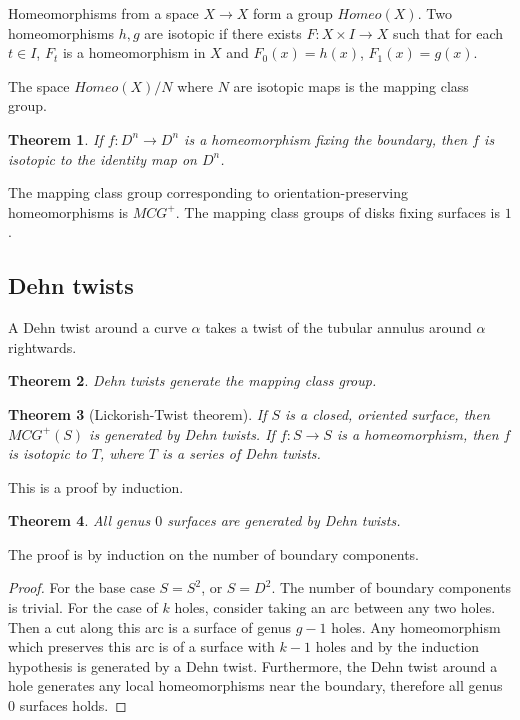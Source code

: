 \documentclass{article}
\newtheorem{theorem}{Theorem}
\theoremstyle{definition}
\numberwithin{theorem}{section}
\numberwithin{equation}{section}
\begin{document}
Homeomorphisms from a space $X \rightarrow X$ form a group $Homeo(X)$.
Two homeomorphisms $h, g$ are isotopic if there exists $F: X \times I \rightarrow X$ such that for each $t \in I$, $F_t$ is a homeomorphism in $X$ and $F_0(x) = h(x)$, $F_1(x) = g(x)$. 

The space $Homeo(X)/N$ where $N$ are isotopic maps is the mapping class group. 

\begin{theorem}
    If $f: D^n \rightarrow D^n$ is a homeomorphism fixing the boundary, then $f$ is isotopic to the identity map on $D^n$. 
\end{theorem}

The mapping class group corresponding to orientation-preserving homeomorphisms is $MCG^+$. The mapping class groups of disks fixing surfaces is $1$. 


\subsection{Dehn twists}

A Dehn twist around a curve $\alpha$ takes a twist of the tubular annulus around $\alpha$ rightwards. 

\begin{theorem}
    Dehn twists generate the mapping class group.
\end{theorem}

\begin{theorem}[Lickorish-Twist theorem]
    If $S$ is a closed, oriented surface, then $MCG^+(S)$ is generated by Dehn twists. If $f : S \rightarrow S$ is a homeomorphism, then $f$ is isotopic to  $T$, where $T$ is a series of Dehn twists. 
\end{theorem}

This is a proof by induction.

\begin{theorem}
    All genus $0$ surfaces are generated by Dehn twists.
\end{theorem}
The proof is by induction on the number of boundary components.

\begin{proof}
    For the base case $S = S^2$, or $S = D^2$. The number of boundary components is trivial. For the case of $k$ holes, consider taking an arc between any two holes. Then a cut along this arc is a surface of genus $g - 1$ holes. Any homeomorphism which preserves this arc is of a surface with $k-1$ holes and by the induction hypothesis is generated by a Dehn twist. Furthermore, the Dehn twist around a hole generates any local homeomorphisms near the boundary, therefore all genus 0 surfaces holds. 
\end{proof}
\end{document}
